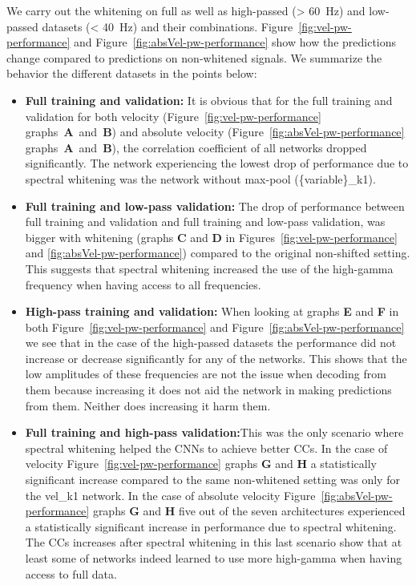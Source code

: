 We carry out the whitening on full as well as high-passed (> 60~Hz) and low-passed datasets (< 40~Hz) and their combinations. 
Figure~\ref{fig:vel-pw-performance} and Figure~\ref{fig:absVel-pw-performance} show how the predictions change compared to predictions on non-whitened signals.
We summarize the behavior the different datasets in the points below:
\begin{itemize}
    \item \textbf{Full training and validation:} It is obvious that for the full training and validation for both velocity (Figure~\ref{fig:vel-pw-performance} graphs~\textbf{A}~and~\textbf{B}) and absolute velocity (Figure~\ref{fig:absVel-pw-performance} graphs~\textbf{A}~and~\textbf{B}), the correlation coefficient of all networks dropped significantly. The network experiencing the lowest drop of performance due to spectral whitening was the network without max-pool (\{variable\}\_k1).

    \item \textbf{Full training and low-pass validation:} The drop of performance between full training and validation and full training and low-pass validation, was bigger with whitening (graphs \textbf{C} and \textbf{D} in Figures~\ref{fig:vel-pw-performance} and \ref{fig:absVel-pw-performance}) compared to the original non-shifted setting. This suggests that spectral whitening increased the use of the high-gamma frequency when having access to all frequencies.  
    
    \item \textbf{High-pass training and validation:} When looking at graphs \textbf{E} and \textbf{F} in both Figure~\ref{fig:vel-pw-performance} and Figure~\ref{fig:absVel-pw-performance} we see that in the case of the high-passed datasets the performance did not increase or decrease significantly for any of the networks. 
    This shows that the low amplitudes of these frequencies are not the issue when decoding from them because increasing it does not aid the network in making predictions from them. Neither does increasing it harm them.
    
    \item \textbf{Full training and high-pass validation:}This was the only scenario where spectral whitening helped the CNNs to achieve better CCs. 
    In the case of velocity Figure~\ref{fig:vel-pw-performance} graphs \textbf{G} and \textbf{H} a statistically significant increase compared to the same non-whitened setting was only for the vel\_k1 network.
    In the case of absolute velocity Figure~\ref{fig:absVel-pw-performance} graphs \textbf{G} and \textbf{H} five out of the seven architectures experienced a statistically significant increase in performance due to spectral whitening.
    The CCs increases after spectral whitening in this last scenario show that at least some of networks indeed learned to use more high-gamma when having access to full data.
\end{itemize}


